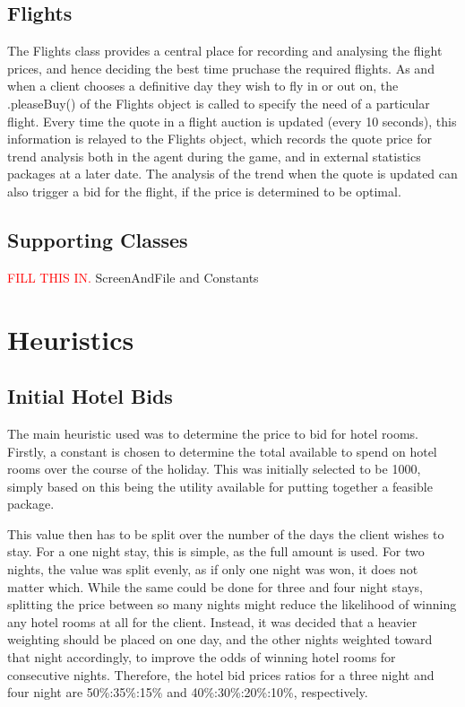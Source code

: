 \documentclass{acm_proc_article-sp}
\begin{document}
  \subsection{Flights}
   The Flights class provides a central place for recording and analysing the flight prices, and hence deciding the best time pruchase the required flights.  As and when a client chooses a definitive day they wish to fly in or out on, the .pleaseBuy() of the Flights object is called to specify the need of a particular flight.  Every time the quote in a flight auction is updated (every 10 seconds), this information is relayed to the Flights object, which records the quote price for trend analysis both in the agent during the game, and in external statistics packages at a later date.  The analysis of the trend when the quote is updated can also trigger a bid for the flight, if the price is determined to be optimal.
   
  \subsection{Supporting Classes}
 \textcolor{red}{FILL THIS IN.}
   ScreenAndFile and Constants

\section{Heuristics}
 \label{heurisitics}
 \subsection{Initial Hotel Bids}
  The main heuristic used was to determine the price to bid for hotel rooms.  Firstly, a constant is chosen to determine the total available to spend on hotel rooms over the course of the holiday.  This was initially selected to be 1000, simply based on this being the utility available for putting together a feasible package.
  
  This value then has to be split over the number of the days the client wishes to stay.  For a one night stay, this is simple, as the full amount is used.  For two nights, the value was split evenly, as if only one night was won, it does not matter which.  While the same could be done for three and four night stays, splitting the price between so many nights might reduce the likelihood of winning any hotel rooms at all for the client.  Instead, it was decided that a heavier weighting should be placed on one day, and the other nights weighted toward that night accordingly, to improve the odds of winning hotel rooms for consecutive nights.  Therefore, the hotel bid prices ratios for a three night and four night are 50\%:35\%:15\% and 40\%:30\%:20\%:10\%, respectively.
  
\end{document}
